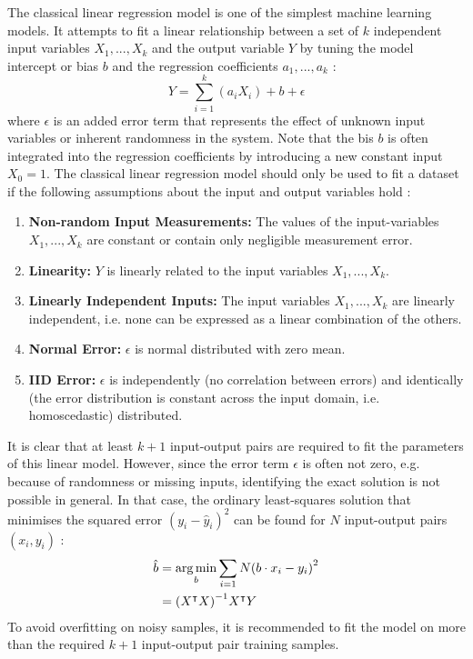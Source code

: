 The classical linear regression model is one of the simplest machine learning models. It attempts to fit a linear relationship between a set of $k$ independent input variables $X_1, ..., X_k$ and the output variable $Y$ by tuning the model intercept or bias $b$ and the regression coefficients $a_1, ..., a_k$ \cite{clrm-assuptions-1971}:
\begin{equation}
    Y = \sum_{i=1}^{k}{(a_i X_i)} + b + \epsilon
\end{equation}
where $\epsilon$ is an added error term that represents the effect of unknown input variables or inherent randomness in the system. Note that the bis $b$ is often integrated into the regression coefficients by introducing a new constant input $X_0 = 1$. The classical linear regression model should only be used to fit a dataset if the following assumptions about the input and output variables hold \cite{clrm-assuptions-1971}:
\begin{enumerate}
    \item \textbf{Non-random Input Measurements:} The values of the input-variables $X_1, ..., X_k$ are constant or contain only negligible measurement error.
    \item \textbf{Linearity:} $Y$ is linearly related to the input variables $X_1, ..., X_k$.
    \item \textbf{Linearly Independent Inputs:} The input variables $X_1, ..., X_k$ are linearly independent, i.e. none can be expressed as a linear combination of the others.
    \item \textbf{Normal Error:} $\epsilon$ is normal distributed with zero mean.
    \item \textbf{IID Error:} $\epsilon$ is independently (no correlation between errors) and identically (the error distribution is constant across the input domain, i.e. homoscedastic) distributed.
\end{enumerate}

\noindent It is clear that at least $k+1$ input-output pairs are required to fit the parameters of this linear model. However, since the error term $\epsilon$ is often not zero, e.g. because of randomness or missing inputs, identifying the exact solution is not possible in general. In that case, the ordinary least-squares solution that minimises the squared error $(y_i-\hat{y}_i)^2$ can be found for $N$ input-output pairs $(x_i, y_i)$ \cite[P/mlr-ols]{stats-proofs-2022}:
\begin{equation}
    \begin{split}
        \hat{b} &= \operatorname*{arg\,min}_{b}{\sum_{i=1}{N}{\left( b \cdot x_i - y_i \right)^2}} \\
                &= {\left( X^{\intercal} X \right)}^{-1} X^{\intercal} Y
    \end{split}
\end{equation}
To avoid overfitting on noisy samples, it is recommended to fit the model on more than the required $k+1$ input-output pair training samples.

